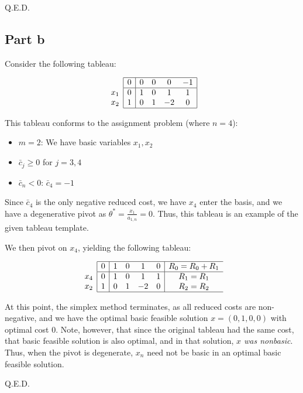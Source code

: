 Q.E.D.

\subsection{Part b}

Consider the following tableau:

$$
\begin{array}{c}
\\
x_1 \\
x_2 \\ 
\end{array}
\begin{array}{|c|cccc|}
\hline
  0 & 0 & 0 & 0 & -1 \\ \hline
  0 & 1 & 0 & 1 & 1 \\
  1 & 0 & 1 & -2 & 0\\ \hline
\end{array}
$$


This tableau conforms to the assignment problem (where $n=4$):
\begin{itemize}
\item $m=2$: We have basic variables $x_1, x_2$
\item $\bar{c}_j\geq 0$ for $j=3, 4$
\item $\bar{c}_n<0$: $\bar{c}_4=-1$
\end{itemize}
Since $\bar{c}_4$ is the only negative reduced cost, we have $x_4$ enter the basis, and we have a degenerative pivot as $\theta^*=\frac{x_1}{a_{1,n}}=0$. Thus, this tableau is an example of the given tableau template.

We then pivot on $x_4$, yielding the following tableau:

$$
\begin{array}{c}
\\
x_4 \\
x_2 \\ 
\end{array}
\begin{array}{|c|cccc|c}
\hline
  0 & 1 & 0 & 1 & 0 & R_0=R_0+R_1\\ \hline
  0 & 1 & 0 & 1 & 1 & R_1=R_1\\
  1 & 0 & 1 & -2 & 0 & R_2=R_2\\ \hline
\end{array}
$$

At this point, the simplex method terminates, as all reduced costs are non-negative, and we have the optimal basic feasible solution $x=(0, 1, 0, 0)$ with optimal cost $0$. Note, however, that since the original tableau had the same cost, that basic feasible solution is also optimal, and in that solution, \textit{$x$ was nonbasic}. Thus, when the pivot is degenerate, $x_n$ need not be basic in an optimal basic feasible solution.

Q.E.D.